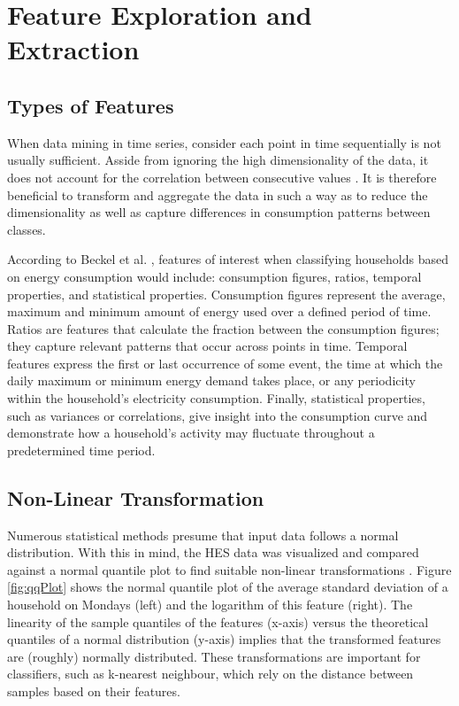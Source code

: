 \chapter{Feature Exploration and Extraction}
\label{ch:Features}

\section{Types of Features}
When data mining in time series,  consider each point in time sequentially is not usually sufficient. Asside from ignoring the high dimensionality of the data,  it does not account for the correlation between consecutive values \cite{Moerchen}. It is therefore beneficial to transform and aggregate the data in such a way as to reduce the dimensionality as well as capture differences in consumption patterns between classes. 

According to Beckel et al. \cite{Beckel_2}, features of interest when classifying households based on energy consumption would include: consumption figures, ratios, temporal properties, and statistical properties. Consumption figures represent the average, maximum and minimum amount of energy used over a defined period of time. Ratios are features that calculate the fraction between the consumption figures; they capture relevant patterns that occur across points in time. Temporal features express the first or last occurrence of some event, the time at which the daily maximum or minimum energy demand takes place, or any periodicity within the household's electricity consumption. Finally, statistical properties, such as variances or correlations, give insight into the consumption curve and demonstrate how a household's activity may fluctuate throughout a predetermined time period.

\section{Non-Linear Transformation}
Numerous statistical methods presume that input data follows a normal distribution. With this in mind, the HES data was visualized and compared against a normal quantile plot to find suitable non-linear transformations \cite{Osborne} \cite{Wang}. Figure \ref{fig:qqPlot} shows the normal quantile plot of the average standard deviation of a household on Mondays (left) and the logarithm of this feature (right). The linearity of the sample quantiles of the features (x-axis) versus the theoretical quantiles of a normal distribution (y-axis) implies that the transformed features are (roughly) normally distributed. These transformations are important for classifiers, such as k-nearest neighbour, which rely on the distance between samples based on their features.

